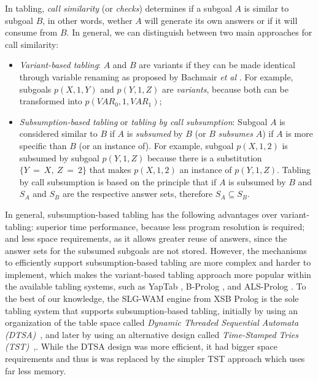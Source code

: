 In tabling, \emph{call similarity} (or \emph{checks}) determines if a subgoal $A$ is similar to subgoal $B$,
in other words, wether $A$ will generate its own answers or if it will consume from $B$. In general,
we can distinguish between two main approaches for call similarity:

\begin{itemize}
   \item \emph{Variant-based tabling}: $A$ and $B$ are variants if they can be made identical
   through variable renaming as proposed by Bachmair \textit{et al} \cite{Bachmair-93}.
   For example, subgoals $p(X,1,Y)$ and $p(Y,1,Z)$ are \emph{variants},
   because both can be transformed into $p(VAR_0,1,VAR_1)$;
   \item \emph{Subsumption-based tabling} or \emph{tabling by call subsumption}: Subgoal $A$ is considered similar
   to $B$ if $A$ is \emph{subsumed} by $B$ (or $B$ \emph{subsumes} $A$) if $A$ is more specific than $B$
   (or an instance of). For example, subgoal $p(X,1,2)$ is subsumed by subgoal $p(Y,1,Z)$ because there
   is a substitution $\{Y~=~X,~Z~=~2\}$ that makes $p(X,1,2)$ an instance of $p(Y,1,Z)$. Tabling by call
   subsumption is based on the principle that if $A$ is subsumed by $B$ and $S_A$ and $S_B$ are the respective
   answer sets, therefore $S_A \subseteq S_B$.
\end{itemize}

In general, subsumption-based tabling has the following advantages over variant-tabling:
superior time performance, because less program resolution is required; and less space requirements,
as it allows greater reuse of answers, since the answer sets for the subsumed subgoals are not stored.
However, the mechanisms to efficiently support subsumption-based tabling are more complex and harder to
implement, which makes the variant-based tabling approach more popular within the available tabling systems,
such as YapTab \cite{Rocha-00a}, B-Prolog \cite{Zhou-00}, and ALS-Prolog \cite{Guo-01}.
To the best of our knowledge, the SLG-WAM \cite{Sagonas-98} engine from XSB Prolog is the sole tabling system that supports
subsumption-based tabling, initially by using an organization of the table space called
\emph{Dynamic Threaded Sequential Automata (DTSA)}~\cite{Rao-96}, and later by using an alternative design called
\emph{Time-Stamped Tries (TST)}~\cite{Johnson-99},.
While the DTSA design was more efficient, it had bigger space requirements and thus is was replaced by the simpler
TST approach which uses far less memory.


